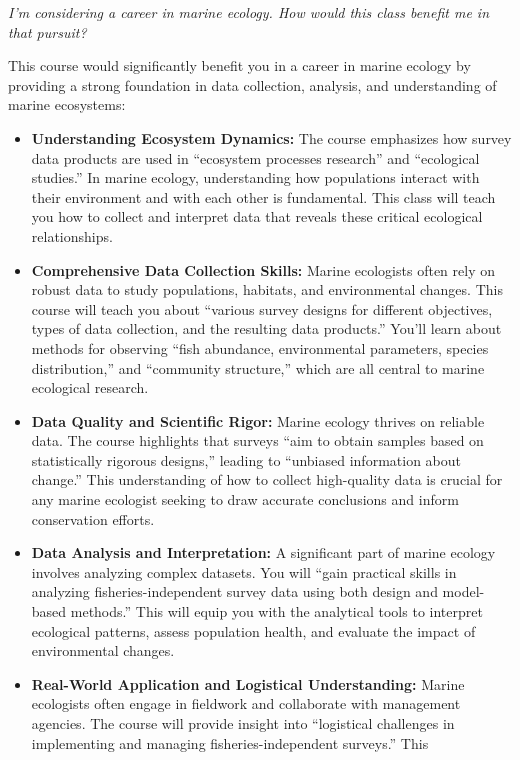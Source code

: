 \documentclass[
  letterpaper,
  oneside,
  open=any]{scrbook}
\providecommand{\tightlist}{%
  \setlength{\itemsep}{0pt}\setlength{\parskip}{0pt}}\usepackage{longtable,booktabs,array}
\begin{document}
\emph{I'm considering a career in marine ecology. How would this class
benefit me in that pursuit?}

This course would significantly benefit you in a career in marine
ecology by providing a strong foundation in data collection, analysis,
and understanding of marine ecosystems:

\begin{itemize}
\tightlist
\item
  \textbf{Understanding Ecosystem Dynamics:} The course emphasizes how
  survey data products are used in ``ecosystem processes research'' and
  ``ecological studies.'' In marine ecology, understanding how
  populations interact with their environment and with each other is
  fundamental. This class will teach you how to collect and interpret
  data that reveals these critical ecological relationships.
\item
  \textbf{Comprehensive Data Collection Skills:} Marine ecologists often
  rely on robust data to study populations, habitats, and environmental
  changes. This course will teach you about ``various survey designs for
  different objectives, types of data collection, and the resulting data
  products.'' You'll learn about methods for observing ``fish abundance,
  environmental parameters, species distribution,'' and ``community
  structure,'' which are all central to marine ecological research.
\item
  \textbf{Data Quality and Scientific Rigor:} Marine ecology thrives on
  reliable data. The course highlights that surveys ``aim to obtain
  samples based on statistically rigorous designs,'' leading to
  ``unbiased information about change.'' This understanding of how to
  collect high-quality data is crucial for any marine ecologist seeking
  to draw accurate conclusions and inform conservation efforts.
\item
  \textbf{Data Analysis and Interpretation:} A significant part of
  marine ecology involves analyzing complex datasets. You will ``gain
  practical skills in analyzing fisheries-independent survey data using
  both design and model-based methods.'' This will equip you with the
  analytical tools to interpret ecological patterns, assess population
  health, and evaluate the impact of environmental changes.
\item
  \textbf{Real-World Application and Logistical Understanding:} Marine
  ecologists often engage in fieldwork and collaborate with management
  agencies. The course will provide insight into ``logistical challenges
  in implementing and managing fisheries-independent surveys.'' This

\end{itemize}
\end{document}
